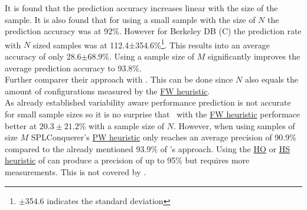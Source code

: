 It is found that the prediction accuracy increases linear with the size of the sample. It is also found that for using a small sample with the size of $N$ the prediction accuracy was at 92\%. However for Berkeley DB (C) the prediction rate with $N$ sized samples was at 112.4$\pm$354.6\%\footnote{$\pm$354.6 indicates the standard deviation}. This results into an average accuracy of only 28.6$\pm$68.9\%. Using a sample size of $M$ significantly improves the average prediction accuracy to 93.8\%.\\
Further \citet{VariabilityAwarePerformancePredictionJianmeiSigmundApel} comparer their approach with \AFID. This can be done since $N$ also equals the amount of configurations measured by the \hyperref[lab:FW]{FW heuristic}.\\
As already established variability aware performance prediction is not accurate for small sample sizes so it is no surprise that \AFID~with the \hyperref[lab:FW]{FW heuristic} performace better at $20.3\pm21.2$\% with a sample size of $N$. However, when using samples of size $M$ SPLConquerer's \hyperref[lab:PW]{PW heuristic} only reaches an average precision of 90.9\% compared to the already mentioned 93.9\% of \citet{VariabilityAwarePerformancePredictionJianmeiSigmundApel}'s approach.
Using the \hyperref[lab:HO]{HO} or \hyperref[lab:HS]{HS heuristic} of \AFID can produce a precision of up to 95\% but requires more measurements. This is not covered by \cite{VariabilityAwarePerformancePredictionJianmeiSigmundApel}.
